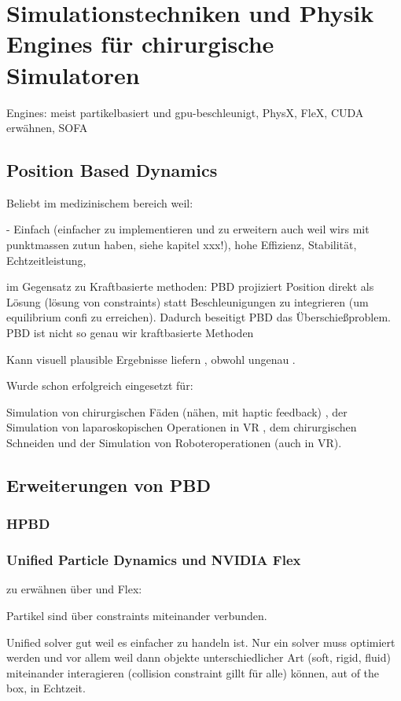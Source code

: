 \section{Simulationstechniken und Physik Engines für chirurgische Simulatoren}
Engines: meist partikelbasiert und gpu-beschleunigt, PhysX, FleX, CUDA erwähnen, SOFA
\subsection{Position Based Dynamics}
\label{section_PBD}

Beliebt im medizinischem bereich weil:

- Einfach (einfacher zu implementieren und zu erweitern auch weil wirs mit punktmassen zutun haben, siehe kapitel xxx!), hohe Effizienz, Stabilität, Echtzeitleistung, 

im Gegensatz zu Kraftbasierte methoden: PBD projiziert Position direkt als Lösung (lösung von constraints) statt Beschleunigungen zu integrieren (um equilibrium confi zu erreichen). Dadurch beseitigt PBD das Überschießproblem. PBD ist nicht so genau wir kraftbasierte Methoden

Kann visuell plausible Ergebnisse liefern \cite{PBDKidney} \cite{BreastBiopsy}, obwohl ungenau .

Wurde schon erfolgreich eingesetzt für:

Simulation von chirurgischen Fäden (nähen, mit haptic feedback) \cite{PBDThread}, 
der Simulation von laparoskopischen Operationen in VR \cite{VRLaparoscop}, 
dem chirurgischen Schneiden \cite{PBDCutting}
und der Simulation von Roboteroperationen \cite{VRRobSim} (auch in VR).


\subsection{Erweiterungen von PBD}
\subsubsection{HPBD}

\subsubsection{Unified Particle Dynamics und NVIDIA Flex}
zu erwähnen über \cite{UPP} und Flex: 

Partikel sind über constraints miteinander verbunden.

Unified solver gut weil es einfacher zu handeln ist. Nur ein solver muss optimiert werden und vor allem weil dann objekte unterschiedlicher Art (soft, rigid, fluid) miteinander interagieren (collision constraint gillt für alle) können, aut of the box, in Echtzeit.

